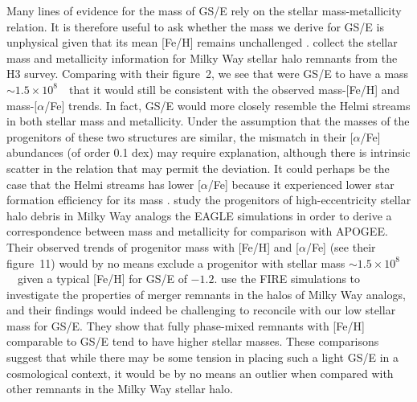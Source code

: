 Many lines of evidence for the mass of GS/E rely on the stellar mass-metallicity relation. It is therefore useful to ask whether the mass we derive for GS/E is unphysical given that its mean [Fe/H] remains unchallenged \parencite[cf. our Figure~\ref{ch3:fig:selection_abundances} with ][]{myeong19,monty20,hasselquist21,horta23a}. \textcite{naidu22} collect the stellar mass and metallicity information for Milky Way stellar halo remnants from the H3 survey. Comparing with their figure~2, we see that were GS/E to have a mass $\sim 1.5\times10^{8}$~\Msun\ that it would still be consistent with the observed mass-[Fe/H] and mass-[$\alpha$/Fe] trends. In fact, GS/E would more closely resemble the Helmi streams \parencite{helmi99} in both stellar mass and metallicity. Under the assumption that the masses of the progenitors of these two structures are similar, the mismatch in their [$\alpha$/Fe] abundances (of order 0.1 dex) may require explanation, although there is intrinsic scatter in the relation that may permit the deviation. It could perhaps be the case that the Helmi streams has lower [$\alpha$/Fe] because it experienced lower star formation efficiency for its mass \parencite[e.g.][]{matsuno22}. \textcite{mackereth19a} study the progenitors of high-eccentricity stellar halo debris in Milky Way analogs the EAGLE simulations in order to derive a correspondence between mass and metallicity for comparison with APOGEE. Their observed trends of progenitor mass with [Fe/H] and [$\alpha$/Fe] (see their figure~11) would by no means exclude a progenitor with stellar mass $\sim 1.5\times10^{8}$~\Msun\ given a typical [Fe/H] for GS/E of $-1.2$. \textcite{horta23b} use the FIRE simulations to investigate the properties of merger remnants in the halos of Milky Way analogs, and their findings would indeed be challenging to reconcile with our low stellar mass for GS/E. They show that fully phase-mixed remnants with [Fe/H] comparable to GS/E tend to have higher stellar masses. These comparisons suggest that while there may be some tension in placing such a light GS/E in a cosmological context, it would be by no means an outlier when compared with other remnants in the Milky Way stellar halo.

